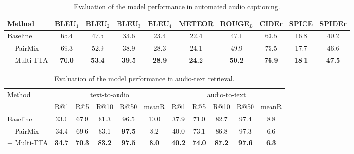 \documentclass{INTERSPEECH2023}
\begin{document}
\begin{table*}[t]
\caption{Evaluation of the model performance in automated audio captioning.}
\label{table:aac}
\centering{}
\begin{tabular}{l|ccccccccc}
\hline
    Method  & BLEU$_1$ & BLEU$_2$ & BLEU$_3$ & BLEU$_4$ & METEOR & ROUGE$_L$ & CIDEr & SPICE & SPIDEr\\ 
   \hline
   Baseline \cite{mei2021audio} & 65.4 & 47.5 & 33.6 & 23.4 & 22.4 & 47.1 & 63.5 & 16.8 & 40.2\\   + PairMix & 69.3 & 52.9 & 38.9 & 28.3 & 24.1 & 49.9 & 75.5 & 17.7 & 46.6\\
   + Multi-TTA & \textbf{70.0} & \textbf{53.4} & \textbf{39.5} & \textbf{28.9} & \textbf{24.2} & \textbf{50.2} & \textbf{76.9} & \textbf{18.1} & \textbf{47.5}\\
   \hline

\end{tabular}
\end{table*}

\begin{table*}[t]
\caption{Evaluation of the model performance in audio-text retrieval.}
\label{table:retrieval}
\centering{}
\begin{tabular}{l|ccccc|ccccc}
\hline
    \multirow{2}{*}{Method} & \multicolumn{5}{c|}{text-to-audio} & \multicolumn{5}{c}{audio-to-text}\\ 
    \cline{2 - 11}
      & R@1 & R@5 & R@10 & R@50 & meanR & R@1 & R@5 & R@10 & R@50 & meanR \\ 
    \hline
    Baseline \cite{Mei2022-qx} & 33.0 & 67.9 & 81.3 & 96.5 & 10.0 & 37.9 & 71.0 & 82.7 & 97.4 & 8.8 \\
    + PairMix & 34.4 & 69.6 & 83.1 & \textbf{97.5} & 8.2 & 40.0 & 73.1 & 86.8 & 97.3 & 6.6 \\
    + Multi-TTA & \textbf{34.7} & \textbf{70.3} & \textbf{83.2} & \textbf{97.5} & \textbf{8.0} & \textbf{40.2} & \textbf{74.0} & \textbf{87.2} & \textbf{97.6} & \textbf{6.3} \\
    \hline
\end{tabular}
\end{table*}
\end{document}
